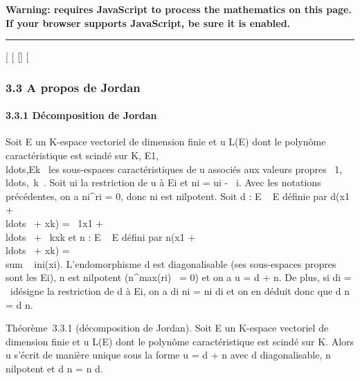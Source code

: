 \textbf{Warning: 
requires JavaScript to process the mathematics on this page.\\ If your
browser supports JavaScript, be sure it is enabled.}

\begin{center}\rule{3in}{0.4pt}\end{center}

{[}
{[}
{[}{]}
{[}

\subsubsection{3.3 A propos de Jordan}

\paragraph{3.3.1 Décomposition de Jordan}

Soit E un K-espace vectoriel de dimension finie et u \in L(E) dont le
polynôme caractéristique est scindé sur K,
E1,\\ldots,Ek~
les sous-espaces caractéristiques de u associés aux valeurs propres
\lambda~1,\\ldots,\lambda~k~.
Soit ui la restriction de u à Ei et ni =
ui -
\lambda~i\mathrmIdEi. Avec les
notations précédentes, on a ni^ri = 0, donc
ni est nilpotent. Soit d : E \rightarrow~ E définie par d(x1 +
\\ldots~ +
xk) = \lambda~1x1 +
\\ldots~ +
\lambda~kxk et n : E \rightarrow~ E défini par n(x1 +
\\ldots~ +
xk) = \\sum ~
ini(xi). L'endomorphisme d est
diagonalisable (ses sous-espaces propres sont les Ei), n est
nilpotent (n^max(ri)~ = 0)
et on a u = d + n. De plus, si di =
\lambda~i\mathrmIdEi désigne
la restriction de d à Ei, on a di \cdot ni =
ni \cdot di et on en déduit donc que d \cdot n = d \cdot n.

Théorème~3.3.1 (décomposition de Jordan). Soit E un K-espace vectoriel
de dimension finie et u \in L(E) dont le polynôme caractéristique est
scindé sur K. Alors u s'écrit de manière unique sous la forme u = d + n
avec d diagonalisable, n nilpotent et d \cdot n = n \cdot d.

